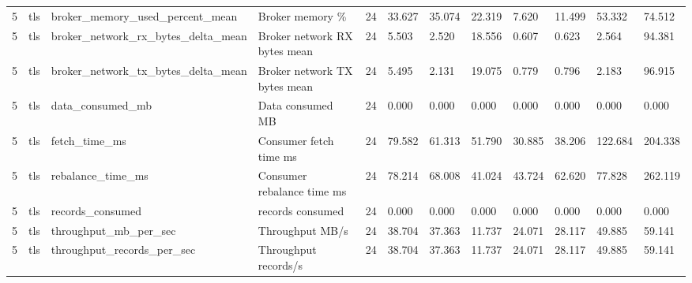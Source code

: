 \begin{tabular}{llllllllllll}
5 & tls & broker\_memory\_used\_percent\_mean & Broker memory \% & 24 & 33.627 & 35.074 & 22.319 & 7.620 & 11.499 & 53.332 & 74.512 \\
5 & tls & broker\_network\_rx\_bytes\_delta\_mean & Broker network RX bytes mean & 24 & 5.503 & 2.520 & 18.556 & 0.607 & 0.623 & 2.564 & 94.381 \\
5 & tls & broker\_network\_tx\_bytes\_delta\_mean & Broker network TX bytes mean & 24 & 5.495 & 2.131 & 19.075 & 0.779 & 0.796 & 2.183 & 96.915 \\
5 & tls & data\_consumed\_mb & Data consumed MB & 24 & 0.000 & 0.000 & 0.000 & 0.000 & 0.000 & 0.000 & 0.000 \\
5 & tls & fetch\_time\_ms & Consumer fetch time ms & 24 & 79.582 & 61.313 & 51.790 & 30.885 & 38.206 & 122.684 & 204.338 \\
5 & tls & rebalance\_time\_ms & Consumer rebalance time ms & 24 & 78.214 & 68.008 & 41.024 & 43.724 & 62.620 & 77.828 & 262.119 \\
5 & tls & records\_consumed & records consumed & 24 & 0.000 & 0.000 & 0.000 & 0.000 & 0.000 & 0.000 & 0.000 \\
5 & tls & throughput\_mb\_per\_sec & Throughput MB/s & 24 & 38.704 & 37.363 & 11.737 & 24.071 & 28.117 & 49.885 & 59.141 \\
5 & tls & throughput\_records\_per\_sec & Throughput records/s & 24 & 38.704 & 37.363 & 11.737 & 24.071 & 28.117 & 49.885 & 59.141 \\
\hline
\end{tabular}
